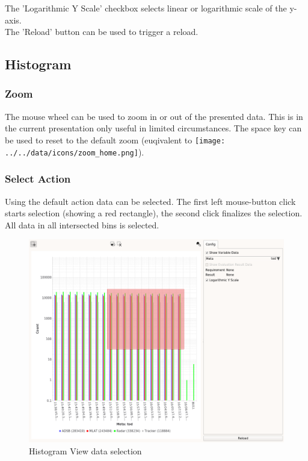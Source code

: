 The 'Logarithmic Y Scale' checkbox selects linear or logarithmic scale of the y-axis. \\

The 'Reload' button can be used to trigger a reload.

\subsection{Histogram}

\subsubsection{Zoom}

The mouse wheel can be used to zoom in or out of the presented data. This is in the current presentation only useful in limited circumstances. The space key can be used to reset to the default zoom (euqivalent to \texttt{[image: ../../data/icons/zoom\_home.png]}).

\subsubsection{Select Action}

Using the default action data can be selected. The first left mouse-button click starts selection (showing a red rectangle), the second click finalizes the selection. All data in all intersected bins is selected.

\begin{figure}[H]
    \hspace*{-2cm}
    \includegraphics[width=18cm,frame]{figures/histogram_select.png}
  \caption{Histogram View data selection}
\end{figure}

